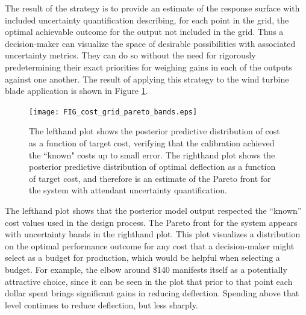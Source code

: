 \documentclass[12pt]{article}
\begin{document}
The result of the strategy is to provide an estimate of the response surface with included uncertainty quantification describing, for each point in the grid, the optimal achievable outcome for the output not included in the grid.
%
Thus a decision-maker can visualize the space of desirable possibilities with associated uncertainty metrics. 
%
They can do so without the need for rigorously predetermining their exact priorities for weighing gains in each of the outputs against one another.
%
The result of applying this strategy to the wind turbine blade application is shown in Figure \ref{fig:known_cost}. 
%
\begin{figure}
\centering
\texttt{[image: FIG\_cost\_grid\_pareto\_bands.eps]}
\caption{The lefthand plot shows the posterior predictive distribution of cost as a function of target cost, verifying that the calibration achieved the ``known" costs up to small error. The righthand plot shows the posterior predictive distribution of optimal deflection as a function of target cost, and therefore is an estimate of the Pareto front for the system with attendant uncertainty quantification.}
\label{fig:known_cost}
\end{figure}
%
The lefthand plot shows that the posterior model output respected the ``known'' cost values used in the design process.
%
The Pareto front for the system appears with uncertainty bands in the righthand plot.
%
This plot visualizes a distribution on the optimal performance outcome for any cost that a decision-maker might select as a budget for production, which would be helpful when selecting a budget.
%
For example, the elbow around \$140 manifests itself as a potentially attractive choice, since it can be seen in the plot that prior to that point each dollar spent brings significant gains in reducing deflection.
%
Spending above that level continues to reduce deflection, but less sharply.
\end{document}

